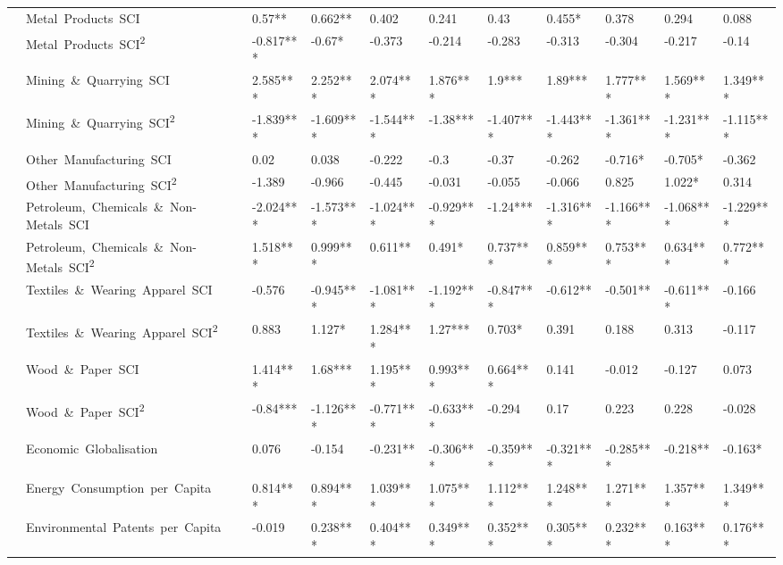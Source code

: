 \documentclass[10pt]{article}
\begin{document}
\begin{table}[ht]
\begin{adjustbox}{width=\textwidth,center}
\begin{tabular}{lllllllllll}
      & Metal\ Products\ SCI & 0.57** & 0.662** & 0.402 & 0.241 & 0.43 & 0.455* & 0.378 & 0.294 & 0.088 \\
      & Metal\ Products\ SCI\textsuperscript{2} & -0.817*** & -0.67* & -0.373 & -0.214 & -0.283 & -0.313 & -0.304 & -0.217 & -0.14 \\
      & Mining\ \&\ Quarrying\ SCI & 2.585*** & 2.252*** & 2.074*** & 1.876*** & 1.9*** & 1.89*** & 1.777*** & 1.569*** & 1.349*** \\
      & Mining\ \&\ Quarrying\ SCI\textsuperscript{2} & -1.839*** & -1.609*** & -1.544*** & -1.38*** & -1.407*** & -1.443*** & -1.361*** & -1.231*** & -1.115*** \\
      & Other\ Manufacturing\ SCI & 0.02 & 0.038 & -0.222 & -0.3 & -0.37 & -0.262 & -0.716* & -0.705* & -0.362 \\
      & Other\ Manufacturing\ SCI\textsuperscript{2} & -1.389 & -0.966 & -0.445 & -0.031 & -0.055 & -0.066 & 0.825 & 1.022* & 0.314 \\
      & Petroleum,\ Chemicals\ \&\ Non-Metals\ SCI & -2.024*** & -1.573*** & -1.024*** & -0.929*** & -1.24*** & -1.316*** & -1.166*** & -1.068*** & -1.229*** \\
      & Petroleum,\ Chemicals\ \&\ Non-Metals\ SCI\textsuperscript{2} & 1.518*** & 0.999*** & 0.611** & 0.491* & 0.737*** & 0.859*** & 0.753*** & 0.634*** & 0.772*** \\
      & Textiles\ \&\ Wearing\ Apparel\ SCI & -0.576 & -0.945*** & -1.081*** & -1.192*** & -0.847*** & -0.612** & -0.501** & -0.611*** & -0.166 \\
      & Textiles\ \&\ Wearing\ Apparel\ SCI\textsuperscript{2} & 0.883 & 1.127* & 1.284*** & 1.27*** & 0.703* & 0.391 & 0.188 & 0.313 & -0.117 \\
      & Wood\ \&\ Paper\ SCI & 1.414*** & 1.68*** & 1.195*** & 0.993*** & 0.664*** & 0.141 & -0.012 & -0.127 & 0.073 \\
      & Wood\ \&\ Paper\ SCI\textsuperscript{2} & -0.84*** & -1.126*** & -0.771*** & -0.633*** & -0.294 & 0.17 & 0.223 & 0.228 & -0.028 \\
      & Economic\ Globalisation & 0.076 & -0.154 & -0.231** & -0.306*** & -0.359*** & -0.321*** & -0.285*** & -0.218** & -0.163* \\
      & Energy\ Consumption\ per\ Capita & 0.814*** & 0.894*** & 1.039*** & 1.075*** & 1.112*** & 1.248*** & 1.271*** & 1.357*** & 1.349*** \\
      & Environmental\ Patents\ per\ Capita & -0.019 & 0.238*** & 0.404*** & 0.349*** & 0.352*** & 0.305*** & 0.232*** & 0.163*** & 0.176*** \\

\end{tabular}
\end{adjustbox}
\end{table}
\end{document}
